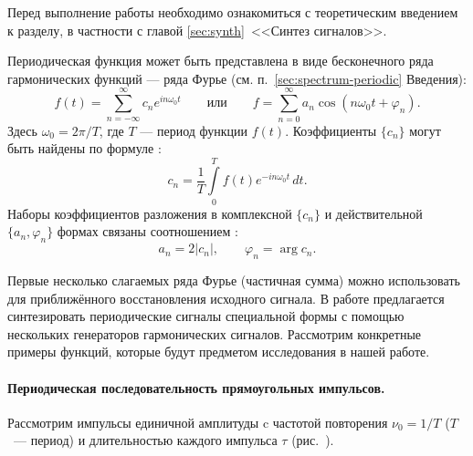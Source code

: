 


Перед выполнение работы необходимо ознакомиться с теоретическим введением
к разделу, в частности с главой \ref{sec:synth}~<<Синтез сигналов>>.


Периодическая функция может быть представлена в виде бесконечного ряда
гармонических функций --- ряда Фурье (см. п.~\ref{sec:spectrum-periodic}
Введения):
\[
f(t) = \sum_{n=-\infty}^{\infty} c_n e^{in\omega_0 t}\qquad\text{или}\qquad
f=\sum_{n=0}^{\infty} a_n \cos (n\omega_0 t + \varphi_n).
\]
Здесь $\omega_0 = 2\pi/T$, где $T$ --- период функции $f(t)$.
Коэффициенты $\{c_n\}$ могут быть найдены по формуле
:
\[
    c_n=\frac{1}{T}\int\limits_{0}^{T} f(t)e^{-in\omega_0 t}\,dt.
\]
Наборы коэффициентов разложения в комплексной $\{c_n\}$ и действительной
$\{a_n,\varphi_n\}$ формах связаны соотношением :
\[
a_n = 2|c_n|,\qquad \varphi_n = \arg c_n.
\]

Первые несколько слагаемых ряда Фурье (частичная сумма) можно использовать
для приближённого восстановления исходного сигнала.
В работе предлагается синтезировать периодические сигналы специальной формы
с помощью нескольких генераторов гармонических сигналов.
Рассмотрим конкретные примеры функций, которые будут предметом
исследования в нашей работе.

\paragraph{Периодическая последовательность прямоугольных импульсов.}
Рассмотрим импульсы единичной амплитуды c частотой повторения
$\nu_{0}=1/T$ ($T$~--- период) и длительностью каждого
импульса $\tau$ (рис.~).

